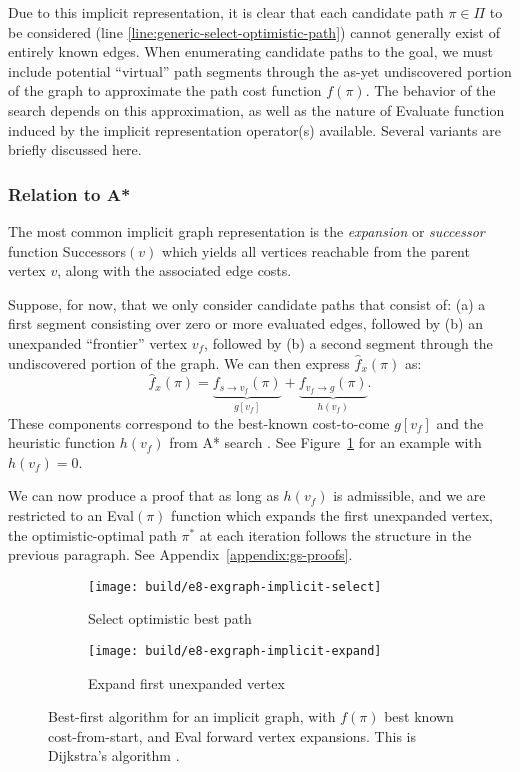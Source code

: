 Due to this implicit representation,
it is clear that each candidate path $\pi \in \Pi$ to be considered
(line \ref{line:generic-select-optimistic-path})
cannot generally exist of entirely known edges.
When enumerating candidate paths to the goal,
we must include potential ``virtual'' path segments
through the as-yet undiscovered portion of the graph
to approximate the path cost function $f(\pi)$.
The behavior of the search depends on this approximation,
as well as the nature of {\sc Evaluate} function induced by
the implicit representation operator(s) available.
Several variants are briefly discussed here.

\subsubsection{Relation to A*}

The most common implicit graph representation
is the \emph{expansion} or \emph{successor} function {\sc Successors}$(v)$
which yields all vertices reachable from the parent vertex $v$,
along with the associated edge costs.

Suppose, for now, that we only consider candidate paths that consist of:
(a) a first segment consisting over zero or more evaluated edges,
followed by
(b) an unexpanded ``frontier'' vertex $v_f$, followed by
(b) a second segment through the undiscovered portion of the graph.
We can then express $\hat{f}_x(\pi)$ as:
\begin{equation}
   \hat{f}_x(\pi)
   = \underbrace{f_{s \rightarrow v_f}(\pi)}_{g[v_f]}
   + \underbrace{f_{v_f \rightarrow g}(\pi)}_{h(v_f)}.
\end{equation}
These components correspond to the best-known cost-to-come $g[v_f]$
and the heuristic function $h(v_f)$ from A* search \cite{hart1968astar}.
See Figure~\ref{fig:seg-implicit} for an example with $h(v_f)=0$.

We can now produce a proof that as long as $h(v_f)$ is admissible,
and we are restricted to an {\sc Eval}$(\pi)$ function which 
expands the first unexpanded vertex,
the optimistic-optimal path $\pi^*$ at each iteration
follows the structure in the previous paragraph.
See Appendix~\ref{appendix:gs-proofs}.

\begin{figure}
   \centering
      \begin{subfigure}[b]{0.45\textwidth}
      \texttt{[image: build/e8-exgraph-implicit-select]}
      \caption{Select optimistic best path}
   \end{subfigure}%
   \quad%
   \begin{subfigure}[b]{0.45\textwidth}
      \texttt{[image: build/e8-exgraph-implicit-expand]}
      \caption{Expand first unexpanded vertex}
   \end{subfigure}%
   \caption{Best-first algorithm for an implicit graph,
      with $f(\pi)$ best known cost-from-start,
      and {\sc Eval} forward vertex expansions.
      This is Dijkstra's algorithm \cite{dijkstra1959anote}.}
   \label{fig:seg-implicit}
\end{figure}

